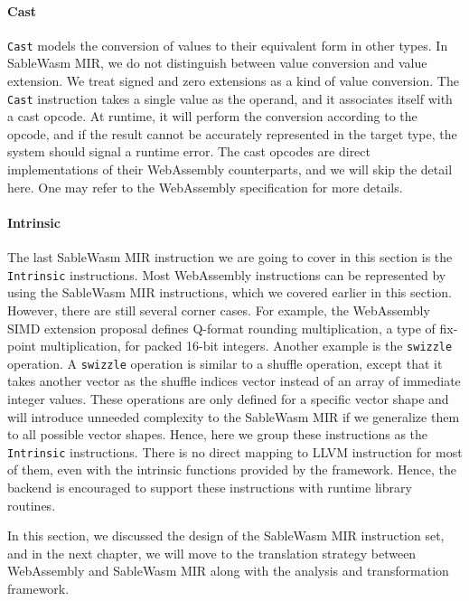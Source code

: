 \paragraph{Cast}
\texttt{Cast} models the conversion of values to their equivalent form in other
types. In SableWasm MIR, we do not distinguish between value conversion and
value extension. We treat signed and zero extensions as a kind of value
conversion. The \texttt{Cast} instruction takes a single value as the operand,
and it associates itself with a cast opcode. At runtime, it will perform the
conversion according to the opcode, and if the result cannot be accurately
represented in the target type, the system should signal a runtime error.
The cast opcodes are direct implementations of their WebAssembly counterparts,
and we will skip the detail here. One may refer to the WebAssembly specification
for more details.

\paragraph{Intrinsic}
The last SableWasm MIR instruction we are going to cover in this section is the
\texttt{Intrinsic} instructions. Most WebAssembly instructions can be
represented by using the SableWasm MIR instructions, which we covered earlier in
this section. However, there are still several corner cases. For example, the
WebAssembly SIMD extension proposal defines Q-format rounding multiplication, a
type of fix-point multiplication, for packed 16-bit integers. Another example is
the \texttt{swizzle} operation. A \texttt{swizzle} operation is similar to a
shuffle operation, except that it takes another vector as the shuffle indices
vector instead of an array of immediate integer values. These operations are
only defined for a specific vector shape and will introduce unneeded complexity
to the SableWasm MIR if we generalize them to all possible vector shapes. Hence,
here we group these instructions as the \texttt{Intrinsic} instructions. There
is no direct mapping to LLVM instruction for most of them, even with the
intrinsic functions provided by the framework. Hence, the backend is encouraged
to support these instructions with runtime library routines.

In this section, we discussed the design of the SableWasm MIR instruction set,
and in the next chapter, we will move to the translation strategy between
WebAssembly and SableWasm MIR along with the analysis and transformation
framework.